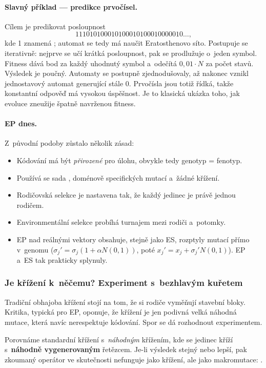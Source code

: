 \documentclass[11pt,a4paper]{article}
\theoremstyle{definition}
\begin{document}
\paragraph{Slavný příklad --- predikce prvočísel.} Cílem je predikovat posloupnost
\[
111010100010100010100010000010\ldots,
\]
kde 1 znamená ; automat se tedy má naučit Eratosthenovo
síto. Postupuje se iterativně: nejprve se učí krátká posloupnost, pak se prodlužuje
o~jeden symbol. Fitness dává bod za každý uhodnutý symbol a~odečítá
$0{,}01 \cdot N$ za počet stavů. Výsledek je poučný. Automaty se postupně
zjednodušovaly, až nakonec vznikl jednostavový automat generující stále 0. Prvočísla
jsou totiž řídká, takže konstantní odpověď  má vysokou úspěšnost.
Je to klasická ukázka toho, jak evoluce zneužije špatně navrženou fitness.

\paragraph{EP dnes.} Z~původní podoby zůstalo několik zásad:
\begin{itemize}
\item Kódování má být \emph{přirozené} pro úlohu, obvykle tedy genotyp = fenotyp.
\item Používá se sada , doménově specifických mutací a~žádné křížení.
\item Rodičovská selekce je nastavena tak, že každý jedinec je právě jednou rodičem.
\item Environmentální selekce probíhá turnajem mezi rodiči a~potomky.
\item EP nad reálnými vektory obsahuje, stejně jako ES, rozptyly mutací přímo v~genomu
  ($\sigma_j' = \sigma_j(1 + \alpha N(0,1))$, poté $x_j' = x_j + \sigma_j' N(0,1)$).
  EP a~ES tak prakticky splynuly.
\end{itemize}

\subsubsection{Je křížení k~něčemu? Experiment s~bezhlavým kuřetem}

Tradiční obhajoba křížení stojí na tom, že si rodiče vyměňují stavební bloky. Kritika,
typická pro EP, oponuje, že křížení je jen podivná velká náhodná mutace, která navíc
nerespektuje kódování. Spor se dá rozhodnout experimentem.

\begin{defbox}
Porovnáme standardní křížení s~\emph{náhodným} křížením, kde se jedinec kříží
s~\textbf{náhodně vygenerovaným} řetězcem. Je-li výsledek stejný nebo lepší, pak zkoumaný
operátor ve skutečnosti nefunguje jako křížení, ale jako makromutace:
.
\end{defbox}
\end{document}
